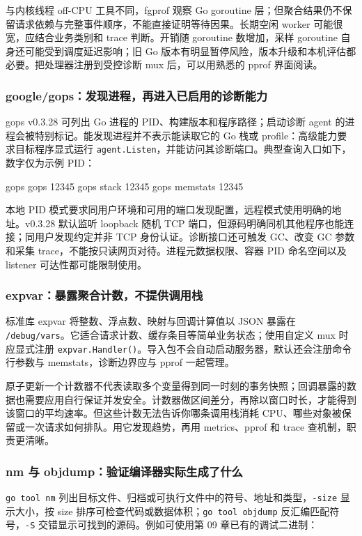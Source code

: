 \documentclass[UTF8,fontset=fandol,openany,11pt]{ctexbook}
\begin{document}
与内核线程 off-CPU 工具不同，fgprof 观察 Go goroutine 层；但聚合结果仍不保留请求依赖与完整事件顺序，不能直接证明等待因果。长期空闲 worker 可能很宽，应结合业务类别和 trace 判断。开销随 goroutine 数增加，采样 goroutine 自身还可能受到调度延迟影响；旧 Go 版本有明显暂停风险，版本升级和本机评估都必要。把处理器注册到受控诊断 mux 后，可以用熟悉的 pprof 界面阅读。

\subsubsection{google/gops：发现进程，再进入已启用的诊断能力}
gops v0.3.28 可列出 Go 进程的 PID、构建版本和程序路径；启动诊断 agent 的进程会被特别标记。能发现进程并不表示能读取它的 Go 栈或 profile：高级能力要求目标程序显式运行 \texttt{agent.\allowbreak{}Listen}，并能访问其诊断端口。典型查询入口如下，数字仅为示例 PID：

\begin{codeblock}
gops
gops 12345
gops stack 12345
gops memstats 12345
\end{codeblock}

本地 PID 模式要求同用户环境和可用的端口发现配置，远程模式使用明确的地址。v0.3.28 默认监听 loopback 随机 TCP 端口，但源码明确同机其他程序也能连接；同用户发现约定并非 TCP 身份认证。诊断接口还可触发 GC、改变 GC 参数和采集 trace，不能按只读网页对待。进程元数据权限、容器 PID 命名空间以及 listener 可达性都可能限制使用。\cite{tools-gops}\cite{tools-gops-agent}

\subsubsection{expvar：暴露聚合计数，不提供调用栈}
标准库 expvar 将整数、浮点数、映射与回调计算值以 JSON 暴露在 \texttt{/\allowbreak{}debug/\allowbreak{}vars}。它适合请求计数、缓存条目等简单业务状态；使用自定义 mux 时应显式注册 \texttt{expvar.\allowbreak{}Handler()}。导入包不会自动启动服务器，默认还会注册命令行参数与 memstats，诊断边界应与 pprof 一起管理。\cite{tools-expvar}

原子更新一个计数器不代表读取多个变量得到同一时刻的事务快照；回调暴露的数据也需要应用自行保证并发安全。计数器做区间差分，再除以窗口时长，才能得到该窗口的平均速率。但这些计数无法告诉你哪条调用栈消耗 CPU、哪些对象被保留或一次请求如何排队。用它发现趋势，再用 metrics、pprof 和 trace 查机制，职责更清晰。

\subsubsection{nm 与 objdump：验证编译器实际生成了什么}
\texttt{go tool nm} 列出目标文件、归档或可执行文件中的符号、地址和类型，\texttt{-\allowbreak{}size} 显示大小，按 size 排序可检查代码或数据体积；\texttt{go tool objdump} 反汇编匹配符号，\texttt{-\allowbreak{}S} 交错显示可找到的源码。例如可使用第 09 章已有的调试二进制：
\end{document}
